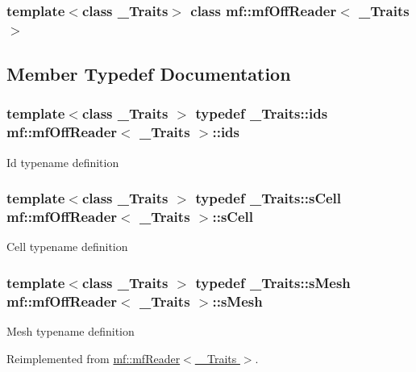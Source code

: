 \subsubsection*{template$<$class \_\-Traits$>$ class mf::mfOffReader$<$ \_\-Traits $>$}



\subsection{Member Typedef Documentation}
\hypertarget{classmf_1_1mfOffReader_abf40a3c998a5b7d45823648315b58d43}{
\subsubsection[{ids}]{\setlength{\rightskip}{0pt plus 5cm}template$<$class \_\-Traits $>$ typedef \_\-Traits::ids {\bf mf::mfOffReader}$<$ \_\-Traits $>$::{\bf ids}}}
\label{classmf_1_1mfOffReader_abf40a3c998a5b7d45823648315b58d43}
Id typename definition \hypertarget{classmf_1_1mfOffReader_acfcb33f834c6ea583daca10ff85c6297}{
\subsubsection[{sCell}]{\setlength{\rightskip}{0pt plus 5cm}template$<$class \_\-Traits $>$ typedef \_\-Traits::sCell {\bf mf::mfOffReader}$<$ \_\-Traits $>$::{\bf sCell}}}
\label{classmf_1_1mfOffReader_acfcb33f834c6ea583daca10ff85c6297}
Cell typename definition \hypertarget{classmf_1_1mfOffReader_afd368bca3db54cfe1e60c4a935e6429f}{
\subsubsection[{sMesh}]{\setlength{\rightskip}{0pt plus 5cm}template$<$class \_\-Traits $>$ typedef \_\-Traits::sMesh {\bf mf::mfOffReader}$<$ \_\-Traits $>$::{\bf sMesh}}}
\label{classmf_1_1mfOffReader_afd368bca3db54cfe1e60c4a935e6429f}
Mesh typename definition 

Reimplemented from \hyperlink{classmf_1_1mfReader}{mf::mfReader$<$ \_\-Traits $>$}.

